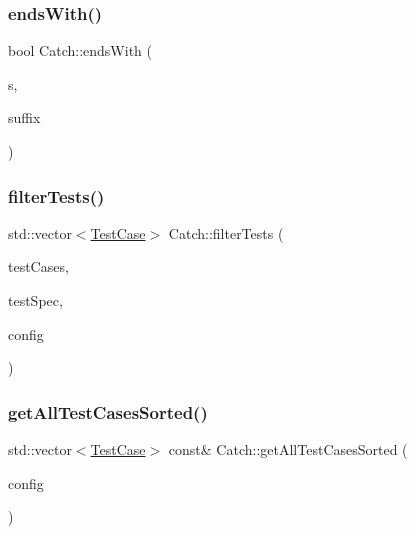 \mbox{\label{namespace_catch_afd801a3e33fd7a8b91ded0d02747a93f}} 
\subsubsection{\texorpdfstring{ends\+With()}{endsWith()}\hspace{0.1cm}{\footnotesize\ttfamily [2/2]}}
{\footnotesize\ttfamily bool Catch\+::ends\+With (\begin{DoxyParamCaption}\item[{std\+::string const \&}]{s,  }\item[{char}]{suffix }\end{DoxyParamCaption})}

\mbox{\label{namespace_catch_ab5da9aa67c42a3f626aea07d0b556829}} 
\subsubsection{\texorpdfstring{filter\+Tests()}{filterTests()}}
{\footnotesize\ttfamily std\+::vector$<$\mbox{\hyperlink{class_catch_1_1_test_case}{Test\+Case}}$>$ Catch\+::filter\+Tests (\begin{DoxyParamCaption}\item[{std\+::vector$<$ \mbox{\hyperlink{class_catch_1_1_test_case}{Test\+Case}} $>$ const \&}]{test\+Cases,  }\item[{Test\+Spec const \&}]{test\+Spec,  }\item[{I\+Config const \&}]{config }\end{DoxyParamCaption})}

\mbox{\label{namespace_catch_a1c9b1a23bc947ea70ddaabf067276cf2}} 
\subsubsection{\texorpdfstring{get\+All\+Test\+Cases\+Sorted()}{getAllTestCasesSorted()}}
{\footnotesize\ttfamily std\+::vector$<$\mbox{\hyperlink{class_catch_1_1_test_case}{Test\+Case}}$>$ const\& Catch\+::get\+All\+Test\+Cases\+Sorted (\begin{DoxyParamCaption}\item[{I\+Config const \&}]{config }\end{DoxyParamCaption})}

